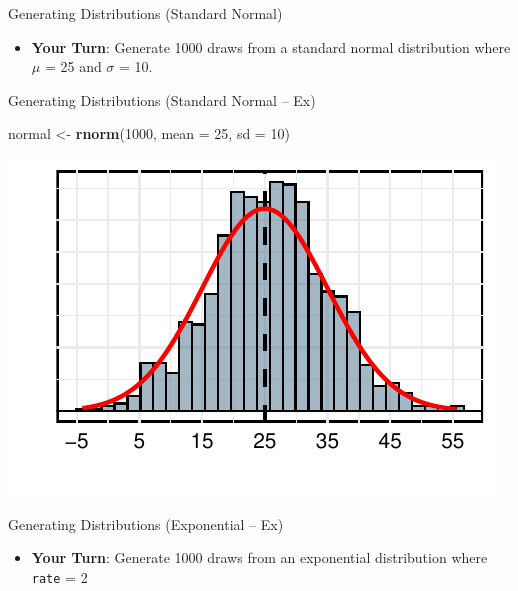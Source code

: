 \documentclass[
  ignorenonframetext,
]{beamer}
\newenvironment{Shaded}{\begin{snugshade}}{\end{snugshade}}
\newcommand{\AttributeTok}[1]{\textcolor[rgb]{0.13,0.29,0.53}{#1}}
\newcommand{\DecValTok}[1]{\textcolor[rgb]{0.00,0.00,0.81}{#1}}
\newcommand{\FunctionTok}[1]{\textcolor[rgb]{0.13,0.29,0.53}{\textbf{#1}}}
\newcommand{\NormalTok}[1]{#1}
\newcommand{\OtherTok}[1]{\textcolor[rgb]{0.56,0.35,0.01}{#1}}
\providecommand{\tightlist}{%
  \setlength{\itemsep}{0pt}\setlength{\parskip}{0pt}}
\begin{document}
\begin{frame}{Generating Distributions (Standard Normal)}
\label{generating-distributions-standard-normal-1}
\begin{itemize}
\tightlist
\item
  \textbf{Your Turn}: Generate 1000 draws from a standard normal
  distribution where \(\mu\) = 25 and \(\sigma\) = 10.
\end{itemize}
\end{frame}

\begin{frame}[fragile]{Generating Distributions (Standard Normal -- Ex)}
\label{generating-distributions-standard-normal-ex}
\begin{Shaded}
\begin{Highlighting}[]
\NormalTok{normal }\OtherTok{\textless{}{-}} \FunctionTok{rnorm}\NormalTok{(}\DecValTok{1000}\NormalTok{, }\AttributeTok{mean =} \DecValTok{25}\NormalTok{, }\AttributeTok{sd =} \DecValTok{10}\NormalTok{)}
\end{Highlighting}
\end{Shaded}

\begin{center}\includegraphics{Class_2_Intermediate_R_Programming_files/figure-beamer/normal_distribution_ex_figure-1} \end{center}
\end{frame}

\begin{frame}{Generating Distributions (Exponential -- Ex)}
\label{generating-distributions-exponential-ex}
\begin{itemize}
\tightlist
\item
  \textbf{Your Turn}: Generate 1000 draws from an exponential
  distribution where \texttt{rate} = 2
\end{itemize}
\end{frame}
\end{document}
